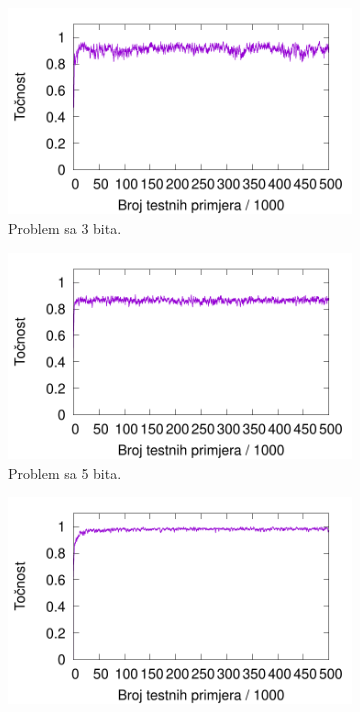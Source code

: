 \documentclass[times, utf8, zavrsni]{fer}
\begin{document}
\begin{figure}
    \centering
    \begin{subfigure}{0.496\textwidth}
        \centering
        \includegraphics[width=\textwidth]{img/majority/3majre.pdf}
        \caption{Problem sa 3 bita.}
        \label{fig:3majre}
    \end{subfigure}
    \hspace{0.05\textwidth}
    \begin{subfigure}{0.496\textwidth}
        \centering
        \includegraphics[width=\textwidth]{img/majority/5majre.pdf}
        \caption{Problem sa 5 bita.}
        \label{fig:5majre}
    \end{subfigure}
    \begin{subfigure}{0.496\textwidth}
        \centering
        \includegraphics[width=\textwidth]{img/majority/7majre.pdf}

\end{subfigure}
\end{figure}
\end{document}
